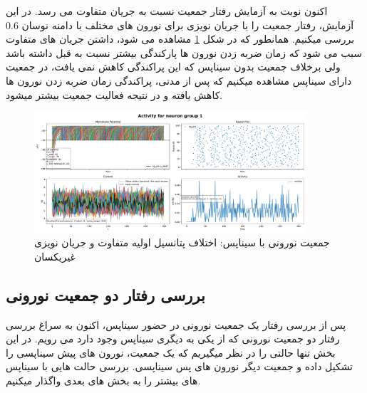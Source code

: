         اکنون نوبت به آزمایش رفتار جمعیت نسبت به جریان متفاوت می رسد. در این آزمایش، رفتار جمعیت را با جریان نویزی برای نورون های مختلف با دامنه نوسان 0.6 بررسی میکنیم. همانطور که در شکل
        \ref{fig:part1-simple-ng-with-synapse-diff-curr}
        مشاهده می شود، داشتن جریان های متفاوت سبب می شود که زمان ضربه زدن نورون ها پارکندگی بیشتر نسبت به قبل داشته باشد ولی برخلاف جمعیت بدون سیناپس که این پراکندگی کاهش نمی یافت، در جمعیت دارای سیناپس مشاهده میکنیم که پس از مدتی، پراکندگی زمان ضربه زدن نورون ها کاهش یافته و در نتیجه فعالیت جمعیت بیشتر میشود.
        \begin{figure}[!ht]
            \centering
            \includegraphics[width=0.9\textwidth]{plots/part1-Simple-ng-with-synapse-diff-curr.pdf} 
            \caption{جمعیت نورونی با سیناپس: اختلاف پتانسیل اولیه متفاوت و جریان نویزی غیریکسان}
            \label{fig:part1-simple-ng-with-synapse-diff-curr}
        \end{figure}

    \subsection{بررسی رفتار دو جمعیت نورونی}
        پس از بررسی رفتار یک جمعیت نورونی در حضور سیناپس، اکنون به سراغ بررسی رفتار دو جمعیت نورونی که از یکی به دیگری سیناپس وجود دارد می رویم. در این بخش تنها حالتی را در نظر میگیریم که یک جمعیت، نورون های پیش سیناپسی را تشکیل داده و جمعیت دیگر نورون های پس سیناپسی. بررسی حالت هایی با سیناپس های بیشتر را به بخش های بعدی واگذار میکنیم.

